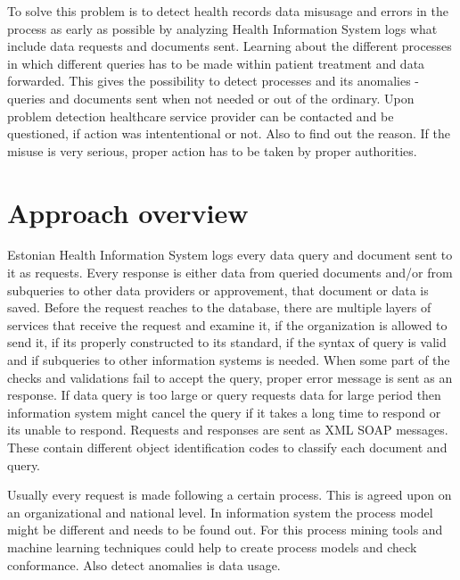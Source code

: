 \documentclass[a4paper, 12pt]{article}
\let\stdsection\section
\renewcommand\section{\newpage\stdsection}
\begin{document}
To solve this problem is to detect health records data misusage and errors in the process as early as possible by analyzing Health Information System logs what include data requests and documents sent. Learning about the different processes in which different queries has to be made within patient treatment and data forwarded. This gives the possibility to detect processes and its anomalies - queries and documents sent when not needed or out of the ordinary. Upon problem detection healthcare service provider can be contacted and be questioned, if action was intententional or not. Also to find out the reason. If the misuse is very serious, proper action has to be taken by proper authorities. 



\section{Approach overview}
Estonian Health Information System logs every data query and document sent to it as requests. Every response is either data from queried documents and/or from subqueries to other data providers or approvement, that document or data is saved. 
Before the request reaches to the database, there are multiple layers of services that receive the request and examine it, if the organization is allowed to send it, if its properly constructed to its standard, if the syntax of query is valid and if subqueries to other information systems is needed. When some part of the checks and validations fail to accept the query, proper error message is sent as an response. If data query is too large or query requests data for large period then information system might cancel the query if it takes a long time to respond or its unable to respond. 
Requests and responses are sent as XML SOAP messages. These contain different object identification codes to classify each document and query. 

Usually every request is made following a certain process. This is agreed upon on an organizational and national level. In information system the process model might be different and needs to be found out. For this process mining tools and machine learning techniques could help to create process models and check conformance. Also detect anomalies is data usage. 
\end{document}
